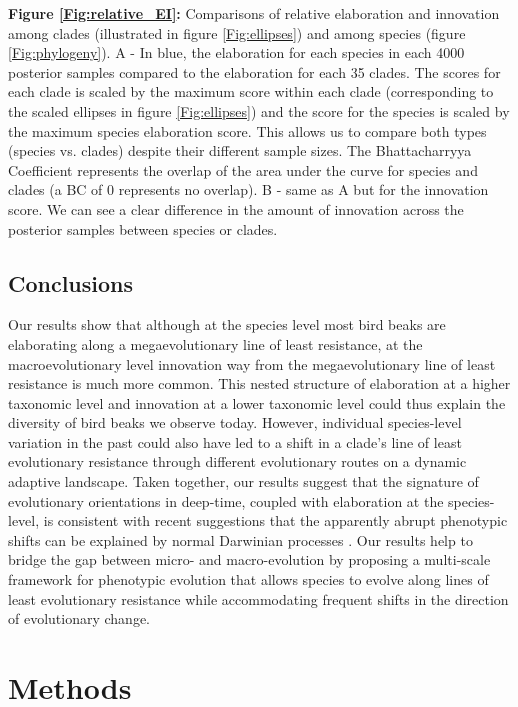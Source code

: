\documentclass[12pt,letterpaper]{article}
\begin{document}
\bigskip

\noindent \textbf{Figure \ref{Fig:relative_EI}:} Comparisons of relative elaboration and innovation among clades (illustrated in figure  \ref{Fig:ellipses}) and among species (figure \ref{Fig:phylogeny}).
A - In blue, the elaboration for each species in each 4000 posterior samples compared to the elaboration for each 35 clades.
The scores for each clade is scaled by the maximum score within each clade (corresponding to the scaled ellipses in figure  \ref{Fig:ellipses}) and the score for the species is scaled by the maximum species elaboration score.
This allows us to compare both types (species vs. clades) despite their different sample sizes.
The Bhattacharryya Coefficient represents the overlap of the area under the curve for species and clades (a BC of 0 represents no overlap).
B - same as A but for the innovation score.
We can see a clear difference in the amount of innovation across the posterior samples between species or clades.


\subsection{Conclusions}

Our results show that although at the species level most bird beaks are elaborating along a megaevolutionary line of least resistance, at the macroevolutionary level innovation way from the megaevolutionary line of least resistance is much more common.
This nested structure of elaboration at a higher taxonomic level and innovation at a lower taxonomic level could thus explain the diversity of bird beaks we observe today.
However, individual species-level variation in the past could also have led to a shift in a clade's line of least evolutionary resistance through different evolutionary routes on a dynamic adaptive landscape. Taken together, our results suggest that the signature of evolutionary orientations in deep-time, coupled with elaboration at the species-level, is consistent with recent suggestions that the apparently abrupt phenotypic shifts can be explained by normal Darwinian processes \cite{pagel2022general}.
Our results help to bridge the gap between micro- and macro-evolution by proposing a multi-scale framework for  phenotypic evolution that allows species to evolve along lines of least evolutionary resistance while accommodating frequent shifts in the direction of evolutionary change.



\section{Methods}
\end{document}
